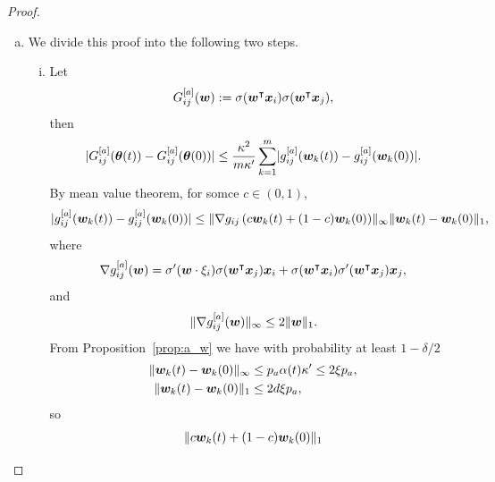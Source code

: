 \documentclass{article}
\begin{document}
\begin{proof}
\begin{enumerate}[(a)]
        \item We divide this proof into the following two steps.
              \begin{enumerate}[(i)]
                  \item Let
                        \begin{equation}
                            G^{[a]}_{ij}(\bm{w}) := \sigma(\bm{w}^\intercal\bm{x}_i)\sigma(\bm{w}^\intercal\bm{x}_j),
                        \end{equation}
                        then
                        \begin{equation}
                            \lvert G_{ij}^{[a]}(\bm{\theta}(t)) - G_{ij}^{[a]}(\bm{\theta}(0))\rvert \leq \frac{\kappa^2}{m\kappa'}\sum_{k=1}^m \lvert g^{[a]}_{ij}(\bm{w}_k(t)) - g^{[a]}_{ij}(\bm{w}_k(0))\rvert.
                        \end{equation}
                        By mean value theorem, for somce $c\in(0,1)$,
                        \begin{equation}
                            \lvert g^{[a]}_{ij}(\bm{w}_k(t)) - g^{[a]}_{ij}(\bm{w}_k(0))\rvert \leq \lVert\nabla g_{ij}\left(c\bm{w}_k(t) + (1-c)\bm{w}_k(0)\right)\rVert_{\infty}\lVert\bm{w}_k(t) - \bm{w}_k(0)\rVert_1,
                        \end{equation}
                        where
                        \begin{equation}
                            \nabla g_{ij}^{[a]}(\bm{w})=\sigma'(\bm{w}\cdot\xi_i)\sigma(\bm{w}^\intercal\bm{x}_j)\bm{x}_i+\sigma(\bm{w}^\intercal\bm{x}_i)\sigma'(\bm{w}^\intercal\bm{x}_j)\bm{x}_j,
                        \end{equation}
                        and
                        \begin{equation}
                            \lVert\nabla g_{ij}^{[a]}(\bm{w})\rVert_{\infty}\leq 2\lVert\bm{w}\rVert_1.
                        \end{equation}
                        From Proposition~\ref{prop:a_w} we have with probability at least $1-\delta/2$
                        \begin{align}
                            \lVert\bm{w}_k(t)-\bm{w}_k(0)\rVert_{\infty} & \leq p_a\alpha(t)\kappa'\leq 2\xi p_a, \\
                            \lVert\bm{w}_k(t)-\bm{w}_k(0)\rVert_1        & \leq 2d\xi p_a,
                        \end{align}
                        so
                        \begin{equation}
                            \begin{aligned}
                                \norm{c\vw_k(t) + (1-c)\vw_k(0)}_1

\end{aligned}
\end{equation}
\end{enumerate}
\end{enumerate}
\end{proof}
\end{document}
